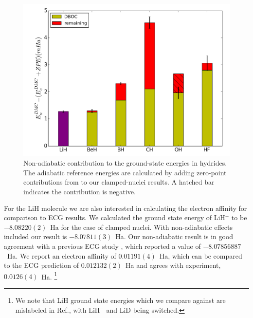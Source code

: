 \documentclass[pra,superscriptaddress,groupedaddress,twocolumn]{revtex4}
\begin{document}
\begin{figure}[h]
\includegraphics[scale=.37]{Figures/dia-nad-ad}
\caption{Non-adiabatic contribution to the ground-state energies in hydrides. The adiabatic reference energies are calculated by adding zero-point contributions from \cite{Feller_Corrections} to our clamped-nuclei results. A hatched bar indicates the contribution is negative. \label{fig:dia-nad-ad}}
\end{figure}

For the LiH molecule we are also interested in calculating the electron affinity for comparison to ECG results. We calculated the ground state energy of LiH$^-$ to be $-8.08220(2)$~Ha for the case of clamped nuclei.  With non-adiabatic effects included our result is  $-8.07811(3)$~Ha. Our non-adiabatic result is in good agreement with a previous ECG study \cite{Bubin_LiH_noBO}, which reported a value of $-8.07856887$~Ha. We report an electron affinity of $0.01191(4)$~Ha, which can be compared to the ECG prediction of $0.012132(2)$~Ha and agrees with experiment, $0.0126(4)$~Ha. \footnote{We note that LiH ground state energies which we compare against are mislabeled in Ref.\cite{Bubin_LiH_noBO}, with $\text{LiH}^-$ and LiD being switched.}
\end{document}
